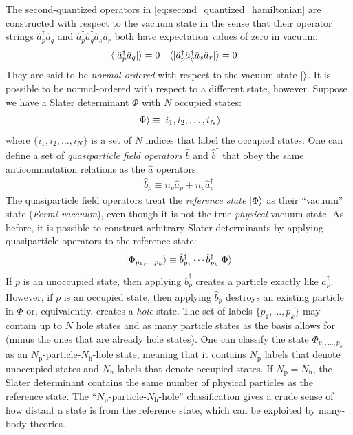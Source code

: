 The second-quantized operators in \eqref{eq:second_quantized_hamiltonian} are constructed with respect to the vacuum state in the sense that their operator strings $\hat{a}_p^\dagger \hat{a}_q$ and $\hat{a}_p^\dagger \hat{a}_q^\dagger \hat{a}_s \hat{a}_r$ both have expectation values of zero in vacuum:
\begin{align*}
&\langle  | \hat{a}_p^\dagger \hat{a}_q |  \rangle = 0 &
&\langle  | \hat{a}_p^\dagger \hat{a}_q^\dagger \hat{a}_s \hat{a}_r |  \rangle = 0
\end{align*}
They are said to be \emph{normal-ordered} with respect to the vacuum state $|  \rangle$.  It is possible to be normal-ordered with respect to a different state, however.  Suppose we have a Slater determinant $\Phi$ with $N$ occupied states:
\begin{align*}
  | \Phi \rangle \equiv | i_1, i_2, \ldots, i_N \rangle
\end{align*}
where $\{i_1, i_2, \ldots, i_N\}$ is a set of $N$ indices that label the occupied states.  One can define a set of \textit{quasiparticle field operators} $\hat b$ and $\hat b^\dagger$ that obey the same anticommutation relations as the $\hat a$ operators:
\begin{align*}
  \hat b_p \equiv \bar n_p \hat a_{p} + n_p \hat a_{p}^\dagger
\end{align*}
The quasiparticle field operators treat the \textit{reference state} $| \Phi \rangle$ as their ``vacuum'' state (\textit{Fermi vaccuum}), even though it is not the true \emph{physical} vacuum state.  As before, it is possible to construct arbitrary Slater determinants by applying quasiparticle operators to the reference state:
\begin{align}
  | \Phi_{p_1, \ldots, p_k} \rangle \equiv \hat{b}^\dagger_{p_1} \cdots \hat{b}^\dagger_{p_k} | \Phi \rangle
  \label{eq:quasisd}
\end{align}
If $p$ is an unoccupied state, then applying $\hat{b}_p^\dagger$ creates a particle exactly like $\hat{a}_p^\dagger$.  However, if $p$ is an occupied state, then applying $\hat{b}_p^\dagger$ destroys an existing particle in $\Phi$ or, equivalently, creates a \textit{hole} state.  The set of labels $\{p_1, \ldots, p_k\}$ may contain up to $N$ hole states and as many particle states as the basis allows for (minus the ones that are already hole states).  One can classify the state $\Phi_{p_1, \ldots, p_k}$ as an $N_{\text{p}}$-particle-$N_{\text{h}}$-hole state, meaning that it contains $N_{\text{p}}$ labels that denote unoccupied states and $N_{\text{h}}$ labels that denote occupied states.  If $N_{\text{p}} = N_{\text{h}}$, the Slater determinant contains the same number of physical particles as the reference state.  The ``$N_{\text{p}}$-particle-$N_{\text{h}}$-hole'' classification gives a crude sense of how distant a state is from the reference state, which can be exploited by many-body theories.

